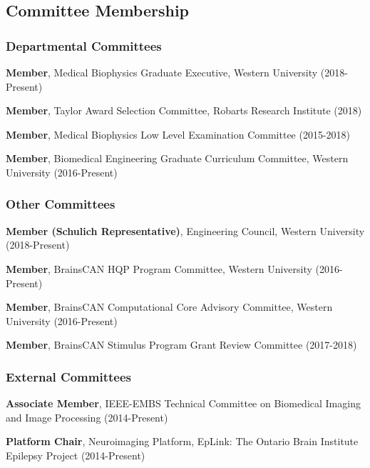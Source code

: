 \subsection{Committee Membership}

\subsubsection*{Departmental Committees}
\begin{packed_enum}
\item \textbf{Member}, Medical Biophysics Graduate Executive, Western University (2018-Present)
\item \textbf{Member}, Taylor Award Selection Committee, Robarts Research Institute (2018)
\item \textbf{Member}, Medical Biophysics Low Level Examination Committee (2015-2018)
\item \textbf{Member}, Biomedical Engineering Graduate Curriculum Committee, Western University (2016-Present)
\end{packed_enum}

\subsubsection*{Other Committees}
\begin{packed_enum}
\item \textbf{Member (Schulich Representative)}, Engineering Council, Western University (2018-Present)
\item \textbf{Member}, BrainsCAN HQP Program Committee, Western University (2016-Present)
\item \textbf{Member}, BrainsCAN Computational Core Advisory Committee, Western University (2016-Present)
\item \textbf{Member}, BrainsCAN Stimulus Program Grant Review Committee (2017-2018)
\end{packed_enum}

\subsubsection*{External Committees}
\begin{packed_enum}
\item \textbf{Associate Member}, IEEE-EMBS Technical Committee on Biomedical Imaging and Image Processing (2014-Present)
\item \textbf{Platform Chair}, Neuroimaging Platform, EpLink: The Ontario Brain Institute Epilepsy Project (2014-Present)
\end{packed_enum}


